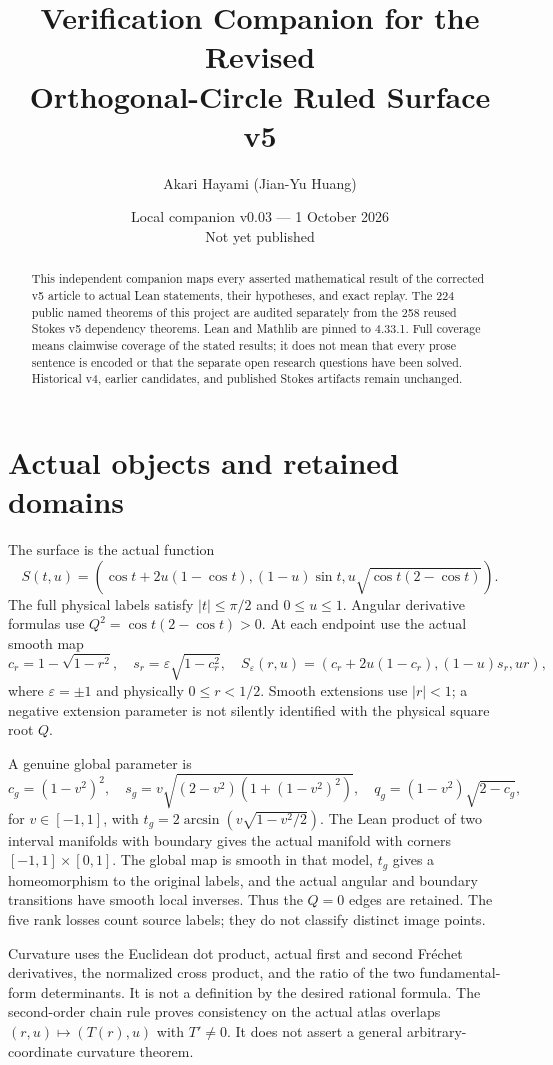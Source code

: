 \documentclass[11pt,a4paper]{article}
\title{Verification Companion for the Revised\\Orthogonal-Circle Ruled Surface v5}
\author{Akari Hayami (Jian-Yu Huang)}
\date{Local companion v0.03 --- 1 October 2026\\Not yet published}
\begin{document}
\maketitle
\begin{abstract}
This independent companion maps every asserted mathematical result of the
corrected v5 article to actual Lean statements, their hypotheses, and exact
replay. The 224 public named theorems of this project are audited separately
from the 258 reused Stokes v5 dependency theorems. Lean and Mathlib are
pinned to 4.33.1. Full coverage means claimwise coverage of the stated
results; it does not mean that every prose sentence is encoded or that
the separate open research questions have been solved. Historical v4,
earlier candidates, and published Stokes artifacts remain unchanged.
\end{abstract}

\section{Actual objects and retained domains}
The surface is the actual function
\[
 S(t,u)=(\cos t+2u(1-\cos t),(1-u)\sin t,
 u\sqrt{\cos t(2-\cos t)}).
\]
The full physical labels satisfy $|t|\leq\pi/2$ and $0\leq u\leq1$.
Angular derivative formulas use $Q^2=\cos t(2-\cos t)>0$.
At each endpoint use the actual smooth map
\[
 c_r=1-\sqrt{1-r^2},\quad s_r=\varepsilon\sqrt{1-c_r^2},\quad
 S_\varepsilon(r,u)=(c_r+2u(1-c_r),(1-u)s_r,ur),
\]
where $\varepsilon=\pm1$ and physically $0\leq r<1/2$.
Smooth extensions use $|r|<1$; a negative extension parameter is not
silently identified with the physical square root $Q$.

A genuine global parameter is
\[
 c_g=(1-v^2)^2,\quad
 s_g=v\sqrt{(2-v^2)(1+(1-v^2)^2)},\quad
 q_g=(1-v^2)\sqrt{2-c_g},
\]
for $v\in[-1,1]$, with $t_g=2\arcsin(v\sqrt{1-v^2/2})$.
The Lean product of two interval manifolds with boundary gives the actual
manifold with corners $[-1,1]\times[0,1]$. The global map is smooth in
that model, $t_g$ gives a homeomorphism to the original labels, and the
actual angular and boundary transitions have smooth local inverses.
Thus the $Q=0$ edges are retained. The five rank losses count source
labels; they do not classify distinct image points.

Curvature uses the Euclidean dot product, actual first and second
Fr\'echet derivatives, the normalized cross product, and the ratio of
the two fundamental-form determinants. It is not a definition by the
desired rational formula. The second-order chain rule proves consistency
on the actual atlas overlaps $(r,u)\mapsto(T(r),u)$ with $T'\ne0$.
It does not assert a general arbitrary-coordinate curvature theorem.
\end{document}
